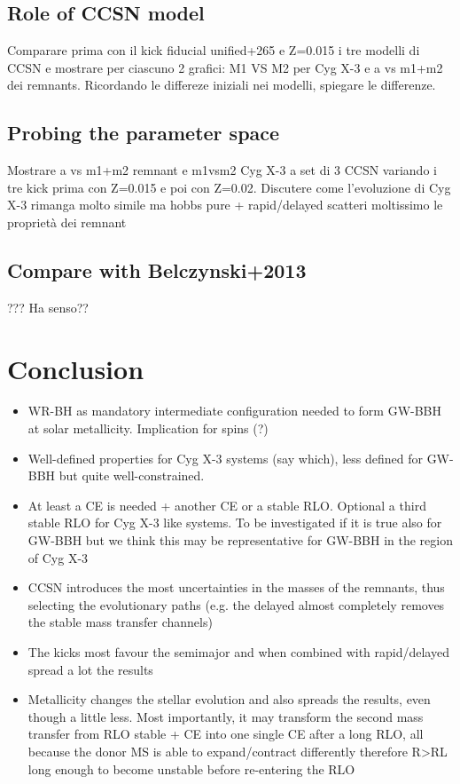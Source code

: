 \documentclass[a4paper,titlepage]{book}     	%
\begin{document}
\section{Role of CCSN model}
Comparare prima con il kick fiducial unified+265 e Z=0.015 i tre modelli di CCSN e mostrare per ciascuno 2 grafici: M1 VS M2 per Cyg X-3 e a vs m1+m2 dei remnants. Ricordando le differeze iniziali nei modelli, spiegare le differenze.


\section{Probing the parameter space}
Mostrare a vs m1+m2 remnant e m1vsm2 Cyg X-3 a set di 3 CCSN variando i tre kick prima con Z=0.015 e poi con Z=0.02. Discutere come l'evoluzione di Cyg X-3 rimanga molto simile ma hobbs pure + rapid/delayed scatteri moltissimo le proprietà dei remnant





\section{Compare with Belczynski+2013}
??? Ha senso??



\chapter{Conclusion}
\begin{itemize}
	\item WR-BH as mandatory intermediate configuration needed to form GW-BBH at solar metallicity. Implication for spins (?)
	\item Well-defined properties for Cyg X-3 systems (say which), less defined for GW-BBH but quite well-constrained.
	\item At least a CE is needed + another CE or a stable RLO. Optional a third stable RLO for Cyg X-3 like systems. To be investigated if it is true also for GW-BBH but we think this may be representative for GW-BBH in the region of Cyg X-3
	\item CCSN introduces the most uncertainties in the masses of the remnants, thus selecting the evolutionary paths (e.g. the delayed almost completely removes the stable mass transfer channels)
	\item The kicks most favour the semimajor and when combined with rapid/delayed spread a lot the results
	\item Metallicity changes the stellar evolution and also spreads the results, even though a little less. Most importantly, it may transform the second mass transfer from RLO stable + CE into one single CE after a long RLO, all because the donor MS is able to expand/contract differently therefore R>RL long enough to become unstable before re-entering the RLO
\end{itemize}
\end{document}

